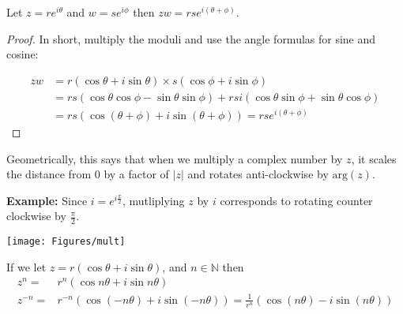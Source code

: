\documentclass[11pt,dvipsnames]{book}
\numberwithin{equation}{section} %
\numberwithin{figure}{section} %
\numberwithin{table}{section} %
\begin{document}
\begin{theorem}
Let $z=re^{i\theta}$ and $w=se^{i\phi}$ then $zw = rs e^{i(\theta + \phi)}$.
\end{theorem}

\begin{proof}
In short, multiply the moduli and use the angle formulas for sine and cosine:

\begin{align*}
zw & = r(\cos \theta + i \sin \theta)\times  s(\cos \phi + i \sin \phi) \\
& = rs ( \cos \theta \cos \phi - \sin \theta \sin \phi)+ rsi (\cos \theta \sin \phi + \sin \theta \cos \phi) \\ 
                                                                                               & = rs (\cos(\theta + \phi) + i\sin(\theta + \phi))= rs e^{i(\theta + \phi)}
\end{align*}
\end{proof}



\begin{multicols}{2}

Geometrically, this says that when we multiply a complex number by $z$, it scales the distance from $0$ by a factor of $|z|$ and rotates anti-clockwise by $\mathrm{arg}(z)$.

{\bf Example:} Since $i=e^{i\frac{\pi}{2}}$, mutliplying $z$ by $i$ corresponds to rotating counter clockwise by $\frac{\pi}{2}$.

\begin{center}
\texttt{[image: Figures/mult]}
\end{center}
\end{multicols}
 
\vspace{10pt}


\begin{theorem}
If we let $z = r(\cos \theta + i \sin \theta)$, and $n \in \mathbb{N}$ then 
\begin{align*}
z^n = &r^{n} (\cos n\theta + i \sin n\theta) \\
z^{-n} = &r^{-n} (\cos (-n\theta) + i \sin (-n\theta)) = \frac{1}{r^n} (\cos (n\theta) - i \sin (n\theta)) 
\end{align*}
\end{theorem}
\end{document}
